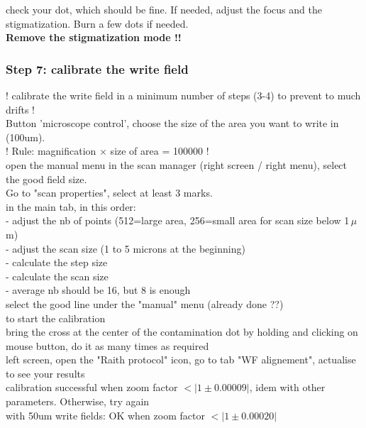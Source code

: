 check your dot, which should be fine. If needed, adjust the focus and the stigmatization. Burn a few dots if needed.\\

\textbf{Remove the stigmatization mode !!}\\


\subsubsection{Step 7: calibrate the write field}

! calibrate the write field in a minimum number of steps (3-4) to prevent to much drifts !\\

Button 'microscope control', choose the size of the area you want to write in (100um).\\
! Rule: magnification $\times$ size of area = 100000 !\\

open the manual menu in the scan manager (right screen / right menu), select the good field size.\\

Go to "scan properties", select at least 3 marks.\\

in the main tab, in this order:\\
- adjust the nb of points (512=large area, 256=small area for scan size below 1\,$\mu$m)\\
- adjust the scan size (1 to 5 microns at the beginning)\\
- calculate the step size\\
- calculate the scan size\\
- average nb should be 16, but 8 is enough\\

select the good line under the "manual" menu (already done ??)\\

 to start the calibration\\

bring the cross at the center of the contamination dot by holding  and clicking on mouse button, do it as many times as required\\

left screen, open the "Raith protocol" icon, go to tab "WF alignement", actualise to see your results\\

calibration successful when zoom factor $<|1\pm0.00009|$, idem with other parameters. Otherwise, try again\\
with 50um write fields: OK when zoom factor $<|1\pm0.00020|$

